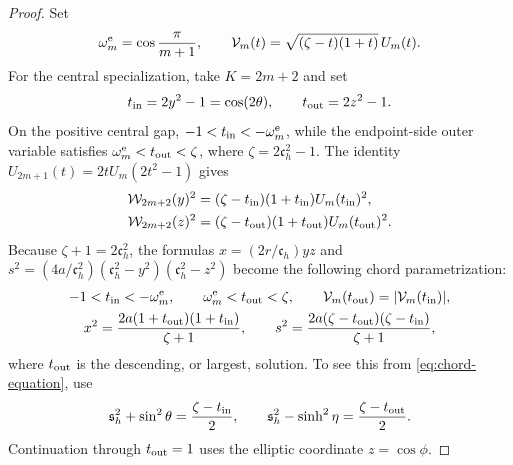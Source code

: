 \documentclass[a4paper,preprint,12pt,nopreprintline,sort&compress]{elsarticle}
\numberwithin{equation}{section}
\theoremstyle{remark}
\begin{document}
\begin{proof}
Set
\[
 \omega_m^{\rm e}=\cos\frac{\pi}{m+1},\qquad
 \mathcal V_m(t)=\sqrt{(\zeta-t)(1+t)}\,U_m(t).
\]
For the central specialization, take \(K=2m+2\) and set
\[
 t_{\rm in}=2y^2-1=\cos(2\theta),\qquad
 t_{\rm out}=2z^2-1.
\]
On the positive central gap,
\(-1<t_{\rm in}<-\omega_m^{\rm e}\), while the endpoint-side outer variable
satisfies
\(\omega_m^{\rm e}<t_{\rm out}<\zeta\), where
\(\zeta=2\mathfrak c_h^2-1\).  The identity
\(U_{2m+1}(t)=2tU_m(2t^2-1)\) gives
\[
 \begin{aligned}
 \mathcal W_{2m+2}(y)^2
  &= (\zeta-t_{\rm in})(1+t_{\rm in})U_m(t_{\rm in})^2,\\
 \mathcal W_{2m+2}(z)^2
  &= (\zeta-t_{\rm out})(1+t_{\rm out})U_m(t_{\rm out})^2.
 \end{aligned}
\]
Because \(\zeta+1=2\mathfrak c_h^2\), the formulas
\(x=(2r/\mathfrak c_h)yz\) and
\(s^2=(4a/\mathfrak c_h^2)
(\mathfrak c_h^2-y^2)(\mathfrak c_h^2-z^2)\) become the following chord
parametrization:
\begin{equation}\label{eq:central-chord}
\begin{gathered}
 -1<t_{\rm in}<-\omega_m^{\rm e},\qquad
 \omega_m^{\rm e}<t_{\rm out}<\zeta,\qquad
 \mathcal V_m(t_{\rm out})=|\mathcal V_m(t_{\rm in})|,\\
 x^2=\frac{2a(1+t_{\rm out})(1+t_{\rm in})}{\zeta+1},\qquad
 s^2=\frac{2a(\zeta-t_{\rm out})(\zeta-t_{\rm in})}{\zeta+1},
\end{gathered}
\end{equation}
where \(t_{\rm out}\) is the descending, or largest, solution.  To see this
from \eqref{eq:chord-equation}, use
\[
 \mathfrak s_h^2+\sin^2\theta=\frac{\zeta-t_{\rm in}}{2},\qquad
 \mathfrak s_h^2-\sinh^2\eta=\frac{\zeta-t_{\rm out}}{2}.
\]
Continuation through \(t_{\rm out}=1\) uses the elliptic coordinate
\(z=\cos\phi\).


\end{proof}
\end{document}
